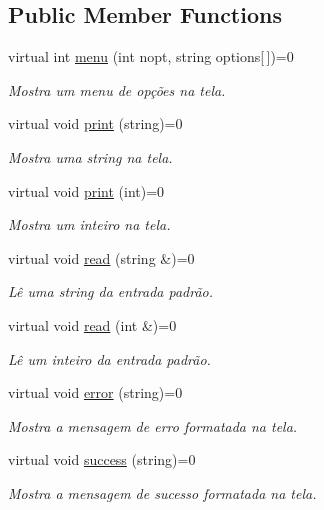\subsection*{Public Member Functions}
\begin{DoxyCompactItemize}
\item 
virtual int \hyperlink{classWindow_aa1d33e14312f6425049d2848c4b99bb7}{menu} (int nopt, string options\mbox{[}$\,$\mbox{]})=0
\begin{DoxyCompactList}\small\item\em Mostra um menu de opções na tela. \end{DoxyCompactList}\item 
virtual void \hyperlink{classWindow_a4fd86bca046073b3429f221c2f3bb690}{print} (string)=0
\begin{DoxyCompactList}\small\item\em Mostra uma string na tela. \end{DoxyCompactList}\item 
virtual void \hyperlink{classWindow_aa0a1210e72a63332e49722f1f878ea94}{print} (int)=0
\begin{DoxyCompactList}\small\item\em Mostra um inteiro na tela. \end{DoxyCompactList}\item 
virtual void \hyperlink{classWindow_abb59602c637907250fd70b1450b85c5c}{read} (string \&)=0
\begin{DoxyCompactList}\small\item\em Lê uma string da entrada padrão. \end{DoxyCompactList}\item 
virtual void \hyperlink{classWindow_ab00a4c057aade6ddc2a4bb22b2a6de42}{read} (int \&)=0
\begin{DoxyCompactList}\small\item\em Lê um inteiro da entrada padrão. \end{DoxyCompactList}\item 
virtual void \hyperlink{classWindow_a2e661d42cd6e7b9c737530f4e34c87f1}{error} (string)=0
\begin{DoxyCompactList}\small\item\em Mostra a mensagem de erro formatada na tela. \end{DoxyCompactList}\item 
virtual void \hyperlink{classWindow_af625e87e68e0510c2fc11f1dc2d42f0e}{success} (string)=0
\begin{DoxyCompactList}\small\item\em Mostra a mensagem de sucesso formatada na tela. \end{DoxyCompactList}\end{DoxyCompactItemize}


